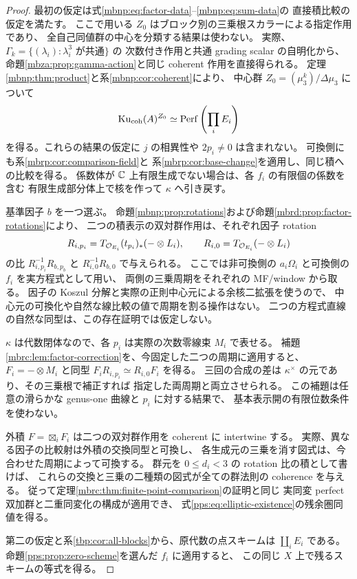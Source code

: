 \begin{proof}
最初の仮定は式\eqref{mbnp:eq:factor-data}--\eqref{mbnp:eq:sum-data}の
直接積比較の仮定を満たす。
ここで用いる $Z_0$ はブロック別の三乗根スカラーによる指定作用であり、
全自己同値群の中心を分類する結果は使わない。
実際、$\Gamma_k=\{(\lambda_i):\lambda_i^3\text{ が共通}\}$ の
次数付き作用と共通 grading scalar の自明化から、
命題\ref{mbza:prop:gamma-action}と同じ coherent 作用を直接得られる。
定理\ref{mbnp:thm:product}と系\ref{mbnp:cor:coherent}により、
中心群 $Z_0=(\mu_3^k)/\Delta\mu_3$ について
\[
 \operatorname{Ku}_{\mathrm{coh}}(A)^{Z_0}\simeq\operatorname{Perf}\left(\prod_iE_i\right)
\]
を得る。これらの結果の仮定に $j$ の相異性や $2p_i\ne0$ は含まれない。
可換側にも系\ref{mbrp:cor:comparison-field}と
系\ref{mbrp:cor:base-change}を適用し、同じ積への比較を得る。
係数体が $\mathbb C$ 上有限生成でない場合は、各 $f_i$ の有限個の係数を含む
有限生成部分体上で核を作って $\kappa$ へ引き戻す。

基準因子 $b$ を一つ選ぶ。
命題\ref{mbnp:prop:rotations}および命題\ref{mbrd:prop:factor-rotations}により、
二つの積表示の双対群作用は、それぞれ因子 rotation
\[
 R_{i,p_i}=T_{\mathcal O_{E_i}}(t_{p_i})_*(-\otimes L_i),\qquad
 R_{i,0}=T_{\mathcal O_{E_i}}(-\otimes L_i)
\]
の比 $R_{i,p_i}^{-1}R_{b,p_b}$ と $R_{i,0}^{-1}R_{b,0}$ で与えられる。
ここでは非可換側の $a_i\Omega_i$ と可換側の $f_i$ を実方程式として用い、
両側の三乗周期をそれぞれの MF/window から取る。
因子の Koszul 分解と実際の正則中心元による余核二拡張を使うので、
中心元の可換化や自然な線比較の値で周期を割る操作はない。
二つの方程式直線の自然な同型は、この存在証明では仮定しない。

$\kappa$ は代数閉体なので、各 $p_i$ は実際の次数零線束 $M_i$ で表せる。
補題\ref{mbrc:lem:factor-correction}を、今固定した二つの周期に適用すると、
$F_i=-\otimes M_i$ と同型
$F_iR_{i,p_i}\simeq R_{i,0}F_i$ を得る。
三回の合成の差は $\kappa^\times$ の元であり、その三乗根で補正すれば
指定した両周期と両立させられる。
この補題は任意の滑らかな genus-one 曲線と $p_i$ に対する結果で、
基本表示開の有限位数条件を使わない。

外積 $F=\boxtimes_iF_i$ は二つの双対群作用を coherent に intertwine する。
実際、異なる因子の比較射は外積の交換同型と可換し、
各生成元の三乗を消す図式は、今合わせた周期によって可換する。
群元を $0\le d_i<3$ の rotation 比の積として書けば、
これらの交換と三乗の二種類の図式が全ての群法則の coherence を与える。
従って定理\ref{mbrc:thm:finite-point-comparison}の証明と同じ
実同変 perfect 双加群と二重同変化の構成が適用でき、
式\eqref{pps:eq:elliptic-existence}の残余圏同値を得る。

第二の仮定と系\ref{tbp:cor:all-blocks}から、原代数の点スキームは
$\coprod_iE_i$ である。
命題\ref{pps:prop:zero-scheme}を選んだ $f_i$ に適用すると、
この同じ $X$ 上で残るスキームの等式を得る。
\end{proof}

